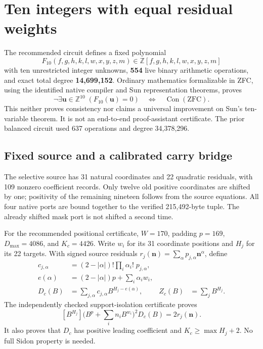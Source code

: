 \section{Ten integers with equal residual weights}
\label{sec:equal-integer}

The recommended circuit defines a fixed polynomial
\[
 F_{10}(f,g,h,k,l,w,x,y,z,m)\in\mathbb Z[f,g,h,k,l,w,x,y,z,m]
\]
with ten unrestricted integer unknowns, \textbf{554} live binary arithmetic
operations, and exact total degree \textbf{14,699,152}. Ordinary mathematics
formalizable in ZFC, using the identified native compiler and Sun
representation theorems, proves
\[
 \neg\exists\mathbf u\in\mathbb Z^{10}\;(F_{10}(\mathbf u)=0)
 \quad\Longleftrightarrow\quad\operatorname{Con}(\mathrm{ZFC}).
\]
This neither proves consistency nor claims a universal improvement on Sun's
ten-variable theorem. It is not an end-to-end proof-assistant certificate.
The prior balanced circuit used 637 operations and degree 34,378,296.

\subsection{Fixed source and a calibrated carry bridge}

The selective source has 31 natural coordinates and 22 quadratic residuals,
with 109 nonzero coefficient records. Only twelve old positive coordinates
are shifted by one; positivity of the remaining nineteen follows from the
source equations. All four native ports are bound together to the verified
215,492-byte tuple. The already shifted mask port is not shifted a second time.

For the recommended positional certificate, $W=170$, padding $p=169$,
$D_{\max}=4086$, and $K_c=4426$. Write $w_i$ for its 31 coordinate positions
and $H_j$ for its 22 targets. With signed source residuals
$r_j(\mathbf n)=\sum_\alpha p_{j,\alpha}\mathbf n^\alpha$, define
\begin{align*}
 c_{j,\alpha}&=(2-|\alpha|)!\prod_i\alpha_i!\;p_{j,\alpha},\\
 e(\alpha)&=(2-|\alpha|)p+\sum_i\alpha_iw_i,\\
 D_c(B)&=\sum_{j,\alpha}c_{j,\alpha}B^{H_j-e(\alpha)},&
 Z_c(B)&=\sum_jB^{H_j}.
\end{align*}
The independently checked support-isolation certificate proves
\[
 [B^{H_j}]\bigl(B^p+\textstyle\sum_i n_iB^{w_i}\bigr)^2D_c(B)
   =2r_j(\mathbf n).
\]
It also proves that $D_c$ has positive leading coefficient and
$K_c\ge\max H_j+2$. No full Sidon property is needed.

